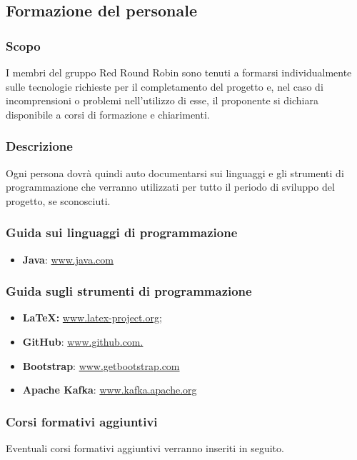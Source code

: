 \subsection{Formazione del personale}

	\subsubsection{Scopo}
		I membri del gruppo Red Round Robin sono tenuti a formarsi individualmente sulle tecnologie richieste per il completamento del progetto e, nel caso di incomprensioni o problemi nell'utilizzo di esse, il proponente si dichiara disponibile a corsi di formazione e chiarimenti.
		
	\subsubsection{Descrizione}
		Ogni persona dovrà quindi auto documentarsi sui linguaggi e gli strumenti di programmazione che verranno utilizzati per tutto il periodo di sviluppo del progetto, se sconosciuti.
		
	\subsubsection{Guida sui linguaggi di programmazione}
		\begin{itemize}
			\item \textbf{Java}: \href{https://www.java.com/}{www.java.com}
		\end{itemize}
	
	\subsubsection{Guida sugli strumenti di programmazione}
		\begin{itemize}
			\item \textbf{\LaTeX{}:} \href{www.latex-project.org}{www.latex-project.org;}
			\item \textbf{GitHub}: \href{www.github.com}{www.github.com.}
			\item \textbf{Bootstrap}: \href{https://getbootstrap.com/}{www.getbootstrap.com}
			\item \textbf{Apache Kafka}: \href{https://kafka.apache.org/}{www.kafka.apache.org}
		\end{itemize}
	
	\subsubsection{Corsi formativi aggiuntivi}
		Eventuali corsi formativi aggiuntivi verranno inseriti in seguito.
